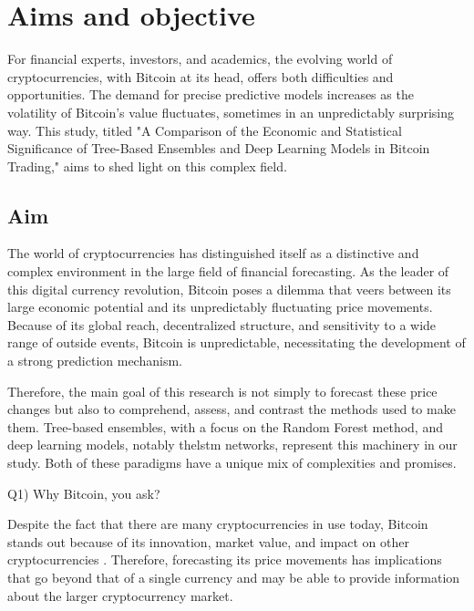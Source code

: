 \section{Aims and objective}
For financial experts, investors, and academics, the evolving world of cryptocurrencies, with Bitcoin at its head, offers both difficulties and opportunities. The demand for precise predictive models increases as the volatility of Bitcoin's value fluctuates, sometimes in an unpredictably surprising way. This study, titled "A Comparison of the Economic and Statistical Significance of Tree-Based Ensembles and Deep Learning Models in Bitcoin Trading," aims to shed light on this complex field.
\smallskip

\goodbreak
\subsection{Aim}
The world of cryptocurrencies has distinguished itself as a distinctive and complex environment in the large field of financial forecasting. As the leader of this digital currency revolution, Bitcoin poses a dilemma that veers between its large economic potential and its unpredictably fluctuating price movements. Because of its global reach, decentralized structure, and sensitivity to a wide range of outside events, Bitcoin is unpredictable, necessitating the development of a strong prediction mechanism.

\smallskip

Therefore, the main goal of this research is not simply to forecast these price changes but also to comprehend, assess, and contrast the methods used to make them. Tree-based ensembles, with a focus on the Random Forest method, and deep learning models, notably the\gls{lstm} networks, represent this machinery in our study. Both of these paradigms have a unique mix of complexities and promises.

\smallskip

Q1)	Why Bitcoin, you ask?

\smallskip

Despite the fact that there are many cryptocurrencies in use today, Bitcoin stands out because of its innovation, market value, and impact on other cryptocurrencies \citep{article}. Therefore, forecasting its price movements has implications that go beyond that of a single currency and may be able to provide information about the larger cryptocurrency market.

